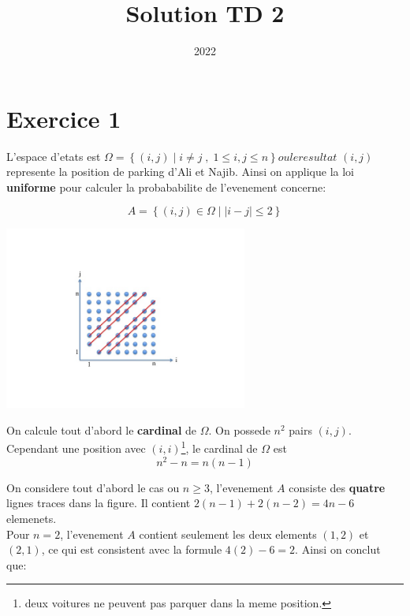 \documentclass[a4paper]{tufte-handout}
\title{Solution TD 2}
\date{2022}
\begin{document}
\maketitle


\section{Exercice 1}
L'espace d'etats est $\Omega = \left\{ (i,j)\;|\; i\neq j\;,\; 1\leq i,j\leq
n\right\} ou le resultat$ $(i,j)$ represente la position de parking d'Ali et
Najib. Ainsi on applique la loi \textbf{uniforme} pour calculer la probababilite
de l'evenement concerne:
 
\begin{equation*}
  A = \left\{ (i,j) \in \Omega \;|\; \vert i -j \vert \leq 2 \right\}
\end{equation*}

\begin{marginfigure}
    \centering
    \includegraphics[width=8cm, height=6cm]{figures/exo1_event.jpg}
\end{marginfigure}

On calcule tout d'abord le \textbf{cardinal} de $\Omega$. On possede $n^2$ pairs
$(i,j)$. Cependant une position avec $(i,i)$\footnote{deux voitures ne peuvent
pas parquer dans la meme position.}, le cardinal de $\Omega$ est 
\begin{equation*}
  n^2 - n = n(n-1)
\end{equation*}


On considere tout d'abord le cas ou $n \geq 3$, l'evenement $A$ consiste des
\textbf{quatre} lignes traces dans la figure. Il contient $2(n-1) + 2(n-2) =
4n-6$ elemenets.\\[4pt]

Pour $n=2$, l'evenement $A$ contient seulement les deux elements $(1,2)$ et
$(2,1)$, ce qui est consistent avec la formule $4(2) - 6 = 2$. Ainsi on conclut
que:
\end{document}
